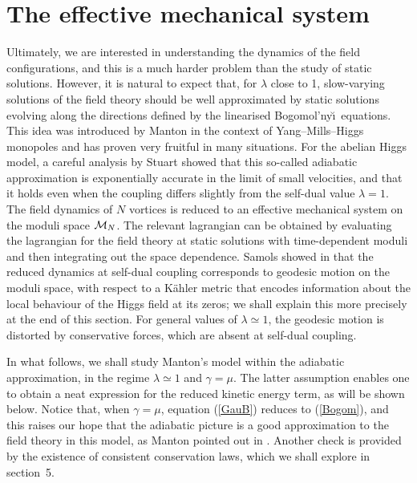 \documentclass[a4paper,11pt]{article}
\begin{document}
\section{The effective mechanical system}


Ultimately, we are interested in understanding the dynamics of the
field configurations, and this is a much harder
problem than the study of static solutions. However, it is natural
to expect that, for $\lambda$ close to 1, 
slow-varying solutions of the field theory 
should be well approximated by static solutions evolving along the
directions defined by the linearised Bogomol'ny\u\i\ equations.
This idea was introduced by Manton in the context of
Yang--Mills--Higgs monopoles
\cite{MBPS} and has proven very fruitful in many situations. 
For the abelian Higgs model, %
a careful analysis by Stuart \cite{StuAH} showed that this so-called
adiabatic approximation is exponentially
accurate in the limit of small velocities, and that it holds even when
the coupling differs slightly from the self-dual value $\lambda=1$. 
The field dynamics of $N$ vortices is reduced to an effective 
mechanical system on the moduli space ${\cal M}_{N}$. 
The relevant lagrangian can be obtained by evaluating the 
lagrangian for the field theory at static solutions 
with time-dependent moduli and then integrating out the space dependence.
Samols showed in \cite{Sam} that the reduced dynamics at self-dual coupling 
corresponds to geodesic motion on the moduli space, with respect to a 
K\"ahler metric that encodes information about the local behaviour of the
Higgs field at its zeros; we shall explain this more precisely at the
end of this section.
For general values of $\lambda\simeq 1$, the geodesic motion is
distorted by conservative forces, which are absent at self-dual coupling.


In what follows, we shall study Manton's model within the adiabatic 
approximation, in
the regime $\lambda\simeq 1$ and $\gamma=\mu$. The latter assumption
enables one to obtain a neat expression for the reduced kinetic energy
term, as will be shown below. Notice that, when 
$\gamma=\mu$, equation (\ref{GauB}) reduces to (\ref{Bogom}), and
this raises our hope that the adiabatic picture is a good
approximation to the field theory in this model, as Manton pointed
out in \cite{Mfovd}. Another check is provided by the existence of
consistent conservation laws, which we shall explore in section~5.
\end{document}
